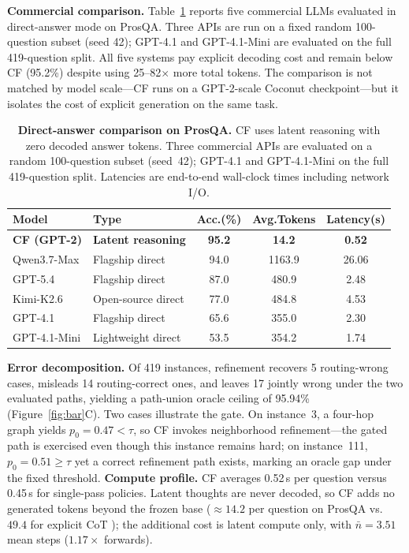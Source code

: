 \documentclass{article}
\theoremstyle{compactthm}
\theoremstyle{compactdef}
\begin{document}
\textbf{Commercial comparison.} Table~\ref{tab:market} reports five commercial LLMs evaluated in direct-answer mode on ProsQA. Three APIs are run on a fixed random 100-question subset (seed 42); GPT-4.1 and GPT-4.1-Mini are evaluated on the full 419-question split. All five systems pay explicit decoding cost and remain below CF (95.2\%) despite using 25--82$\times$ more total tokens. The comparison is not matched by model scale---CF runs on a GPT-2-scale Coconut checkpoint---but it isolates the cost of explicit generation on the same task.
\begin{table}[t]
  \centering
  \caption{\textbf{Direct-answer comparison on ProsQA.} CF uses latent reasoning with zero decoded answer tokens. Three commercial APIs are evaluated on a random 100-question subset (seed~42); GPT-4.1 and GPT-4.1-Mini on the full 419-question split. Latencies are end-to-end wall-clock times including network I/O.}
  \label{tab:market}
  \footnotesize
  \begin{tabular}{llccc}
    \toprule
    Model & Type & Acc.(\%) & Avg.Tokens & Latency(s) \\
    \midrule
    \textbf{CF (GPT-2)} & \textbf{Latent reasoning} & \textbf{95.2} & \textbf{14.2} & \textbf{0.52} \\
    \midrule
    Qwen3.7-Max & Flagship direct & 94.0 & 1163.9 & 26.06 \\
    GPT-5.4 & Flagship direct & 87.0 & 480.9 & 2.48 \\
    Kimi-K2.6 & Open-source direct & 77.0 & 484.8 & 4.53 \\
    GPT-4.1 & Flagship direct & 65.6 & 355.0 & 2.30 \\
    GPT-4.1-Mini & Lightweight direct & 53.5 & 354.2 & 1.74 \\
    \bottomrule
  \end{tabular}
\end{table}


\noindent\textbf{Error decomposition.} Of 419 instances, refinement recovers 5 routing-wrong cases, misleads 14 routing-correct ones, and leaves 17 jointly wrong under the two evaluated paths, yielding a path-union oracle ceiling of 95.94\% (Figure~\ref{fig:bar}C). Two cases illustrate the gate. On instance~3, a four-hop graph yields $p_0{=}0.47<\tau$, so CF invokes neighborhood refinement---the gated path is exercised even though this instance remains hard; on instance~111, $p_0{=}0.51\ge\tau$ yet a correct refinement path exists, marking an oracle gap under the fixed threshold. \textbf{Compute profile.} CF averages 0.52\,s per question versus 0.45\,s for single-pass policies. Latent thoughts are never decoded, so CF adds no generated tokens beyond the frozen base (${\approx}14.2$ per question on ProsQA vs.\ $49.4$ for explicit CoT \citep{hao2024coconut}); the additional cost is latent compute only, with $\bar n{=}3.51$ mean steps ($1.17\times$ forwards).
\end{document}
